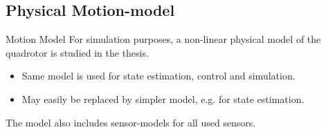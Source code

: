     \subsection{Physical Motion-model}
    \begin{frame}{Motion Model}
        For simulation purposes, a non-linear physical model of the quadrotor
        is studied in the thesis.
        \begin{itemize}
            \item Same model is used for state estimation, control and simulation.
            \item May easily be replaced by simpler model, e.g. for state estimation.
        \end{itemize}

        The model also includes sensor-models for all used sensors.
    \end{frame}

